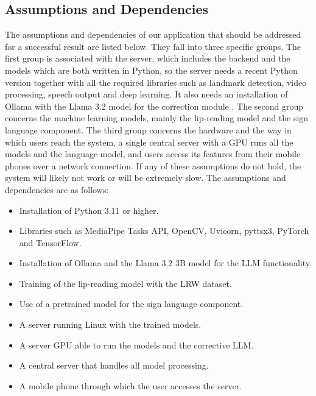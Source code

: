 \documentclass{FastFyp}
\begin{document}
\subsection{Assumptions and Dependencies}
The assumptions and dependencies of our application that should be addressed for a successful result are listed below. They fall into three specific groups. The first group is associated with the server, which includes the backend and the models which are both written in Python, so the server needs a recent Python version together with all the required libraries such as landmark detection, video processing, speech output and deep learning. It also needs an installation of Ollama with the Llama 3.2 model for the correction module \cite{ollama_llama32_3b}. The second group concerns the machine learning models, mainly the lip-reading model and the sign language component. The third group concerns the hardware and the way in which users reach the system, a single central server with a GPU runs all the models and the language model, and users access its features from their mobile phones over a network connection. 
If any of these assumptions do not hold, the system will likely not work or will be extremely slow.  
The assumptions and dependencies are as follows:
\begin{itemize}
\item Installation of Python 3.11 or higher.
\item Libraries such as MediaPipe Tasks API, OpenCV, Uvicorn, pyttsx3, PyTorch and TensorFlow.
\item Installation of Ollama and the Llama 3.2 3B model for the LLM functionality.
\item Training of the lip-reading model with the LRW dataset.
\item Use of a pretrained model for the sign language component.
\item A server running Linux with the trained models.
\item A server GPU able to run the models and the corrective LLM.
\item A central server that handles all model processing.
\item A mobile phone through which the user accesses the server.
\end{itemize}
\end{document}
